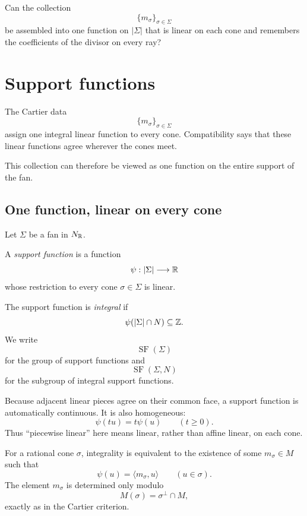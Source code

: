 \begin{guidingquestion}
Can the collection
\[
\{m_\sigma\}_{\sigma\in\Sigma}
\]
be assembled into one function on \(|\Sigma|\) that is linear on each
cone and remembers the coefficients of the divisor on every ray?
\end{guidingquestion}


\section{Support functions}
\label{sec:support-functions}

The Cartier data
\[
\{m_\sigma\}_{\sigma\in\Sigma}
\]
assign one integral linear function to every cone. Compatibility says
that these linear functions agree wherever the cones meet.

This collection can therefore be viewed as one function on the entire
support of the fan.

\subsection{One function, linear on every cone}

\begin{definition}
\label{def:support-function}
Let \(\Sigma\) be a fan in \(N_{\mathbb{R}}\).

A \emph{support function} is a function
\[
\psi:|\Sigma|\longrightarrow\mathbb{R}
\]
whose restriction to every cone \(\sigma\in\Sigma\) is linear.

The support function is \emph{integral} if
\[
\psi(|\Sigma|\cap N)\subseteq\mathbb{Z}.
\]
We write
\[
\operatorname{SF}(\Sigma)
\]
for the group of support functions and
\[
\operatorname{SF}(\Sigma,N)
\]
for the subgroup of integral support functions.
\end{definition}

Because adjacent linear pieces agree on their common face, a support
function is automatically continuous. It is also homogeneous:
\[
\psi(tu)=t\psi(u)
\qquad
(t\geq0).
\]
Thus ``piecewise linear'' here means linear, rather than affine
linear, on each cone.

For a rational cone \(\sigma\), integrality is equivalent to the
existence of some \(m_\sigma\in M\) such that
\[
\psi(u)=\langle m_\sigma,u\rangle
\qquad
(u\in\sigma).
\]
The element \(m_\sigma\) is determined only modulo
\[
M(\sigma)=\sigma^\perp\cap M,
\]
exactly as in the Cartier criterion.

